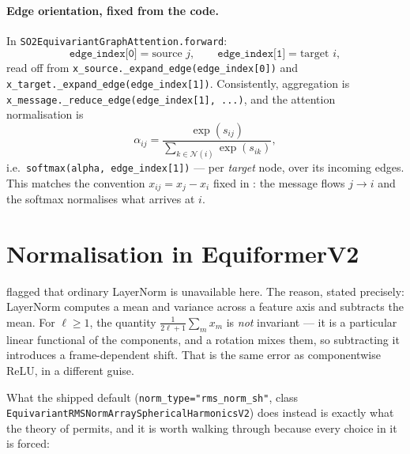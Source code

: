 \documentclass[11pt,a4paper]{report}
\theoremstyle{definition}
\theoremstyle{remark}
\newcommand{\pyfunc}[1]{\texttt{#1}}
\begin{document}
\paragraph{Edge orientation, fixed from the code.} In
\pyfunc{SO2EquivariantGraphAttention.forward}:
\[
\texttt{edge\_index[0]} = \text{source } j,
\qquad
\texttt{edge\_index[1]} = \text{target } i ,
\]
read off from \texttt{x\_source.\_expand\_edge(edge\_index[0])} and
\texttt{x\_target.\_expand\_edge(edge\_index[1])}. Consistently,
aggregation is \texttt{x\_message.\_reduce\_edge(edge\_index[1], ...)}, and the
attention normalisation is
\[
\alpha_{ij}=\frac{\exp(s_{ij})}{\sum_{k\in\mathcal N(i)}\exp(s_{ik})},
\]
i.e.\ \texttt{softmax(alpha, edge\_index[1])} --- per \emph{target} node, over
its incoming edges. This matches the convention $x_{ij}=x_j-x_i$ fixed in
: the message flows $j\to i$ and the softmax
normalises what arrives at $i$.

\section{Normalisation in EquiformerV2}
\label{sec:v2-normalisation}

 flagged that ordinary LayerNorm is unavailable here.
The reason, stated precisely: LayerNorm computes a mean and variance across a
feature axis and subtracts the mean. For $\ell\ge1$, the quantity
$\frac{1}{2\ell+1}\sum_m x_m$ is \emph{not} invariant --- it is a particular
linear functional of the components, and a rotation mixes them, so
subtracting it introduces a frame-dependent shift. That is the same error as
componentwise $\mathrm{ReLU}$, in a different guise.

What the shipped default (\texttt{norm\_type="rms\_norm\_sh"}, class
\pyfunc{EquivariantRMSNormArraySphericalHarmonicsV2}) does instead is exactly
what the theory of  permits, and it is worth
walking through because every choice in it is forced:
\end{document}
